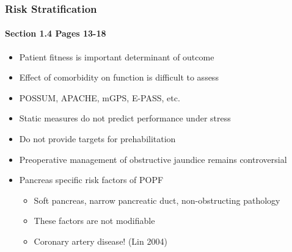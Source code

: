\documentclass[10pt]{beamer}
\begin{document}
\begin{frame}
	\frametitle{Risk Stratification }
	\framesubtitle{Section 1.4 Pages 13-18 }
	\begin{itemize}
		\item Patient fitness is important determinant of outcome
		\item Effect of comorbidity on function is difficult to assess
		\item POSSUM, APACHE, mGPS, E-PASS, etc.
		\item Static measures do not predict performance under stress
		\item Do not provide targets for prehabilitation
		\item Preoperative management of obstructive jaundice remains controversial
		\item Pancreas specific risk factors of POPF
		\begin{itemize}
			\item Soft pancreas, narrow pancreatic duct, non-obstructing pathology
			\item These factors are not modifiable
			\item Coronary artery disease! (Lin 2004)
		\end{itemize}
	\end{itemize}
\end{frame}
\end{document}
